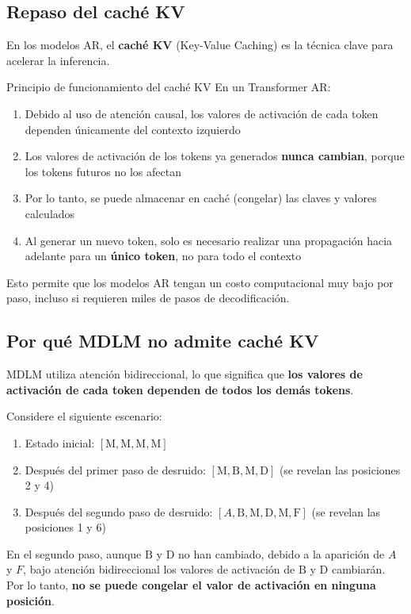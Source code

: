 \documentclass[a4paper]{article}
\begin{document}
\subsection{Repaso del caché KV}

En los modelos AR, el \textbf{caché KV} (Key-Value Caching) es la técnica clave para acelerar la inferencia.

\begin{knowledgebox}{Principio de funcionamiento del caché KV}
En un Transformer AR:
\begin{enumerate}
    \item Debido al uso de atención causal, los valores de activación de cada token dependen únicamente del contexto izquierdo
    \item Los valores de activación de los tokens ya generados \textbf{nunca cambian}, porque los tokens futuros no los afectan
    \item Por lo tanto, se puede almacenar en caché (congelar) las claves y valores calculados
    \item Al generar un nuevo token, solo es necesario realizar una propagación hacia adelante para un \textbf{único token}, no para todo el contexto
\end{enumerate}
Esto permite que los modelos AR tengan un costo computacional muy bajo por paso, incluso si requieren miles de pasos de decodificación.
\end{knowledgebox}

\subsection{Por qué MDLM no admite caché KV}

MDLM utiliza atención bidireccional, lo que significa que \textbf{los valores de activación de cada token dependen de todos los demás tokens}.

Considere el siguiente escenario:
\begin{enumerate}
    \item Estado inicial: $[\text{M}, \text{M}, \text{M}, \text{M}]$
    \item Después del primer paso de desruido: $[\text{M}, \text{B}, \text{M}, \text{D}]$ (se revelan las posiciones 2 y 4)
    \item Después del segundo paso de desruido: $[A, \text{B}, \text{M}, \text{D}, \text{M}, \text{F}]$ (se revelan las posiciones 1 y 6)
\end{enumerate}

En el segundo paso, aunque $\text{B}$ y $\text{D}$ no han cambiado, debido a la aparición de $A$ y $F$, bajo atención bidireccional los valores de activación de $\text{B}$ y $\text{D}$ cambiarán. Por lo tanto, \textbf{no se puede congelar el valor de activación en ninguna posición}.
\end{document}

